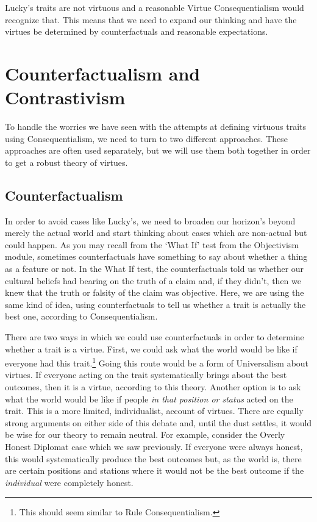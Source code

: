 Lucky’s traits are not virtuous and a reasonable Virtue Consequentialism would recognize that. This means that we need to expand our thinking and have the virtues be determined by counterfactuals and reasonable expectations.

\section{Counterfactualism and Contrastivism}

To handle the worries we have seen with the attempts at defining virtuous traits using Consequentialism, we need to turn to two different approaches. These approaches are often used separately, but we will use them both together in order to get a robust theory of virtues. 

\subsection{Counterfactualism}

In order to avoid cases like Lucky's, we need to broaden our horizon's beyond merely the actual world and start thinking about cases which are non-actual but could happen. As you may recall from the `What If' test from the Objectivism module, sometimes counterfactuals have something to say about whether a thing as a feature or not. In the What If test, the counterfactuals told us whether our cultural beliefs had bearing on the truth of a claim and, if they didn't, then we knew that the truth or falsity of the claim was objective. Here, we are using the same kind of idea, using counterfactuals to tell us whether a trait is actually the best one, according to Consequentialism. 

There are two ways in which we could use counterfactuals in order to determine whether a trait is a virtue. First, we could ask what the world would be like if everyone had this trait.\footnote{This should seem similar to Rule Consequentialism.} Going this route would be a form of Universalism about virtues. If everyone acting on the trait systematically brings about the best outcomes, then it is a virtue, according to this theory. Another option is to ask what the world would be like if people \emph{in that position or status} acted on the trait. This is a more limited, individualist, account of virtues. There are equally strong arguments on either side of this debate and, until the dust settles, it would be wise for our theory to remain neutral. For example, consider the Overly Honest Diplomat case which we saw previously. If everyone were always honest, this would systematically produce the best outcomes but, as the world is, there are certain positions and stations where it would not be the best outcome if the \emph{individual} were completely honest. 

